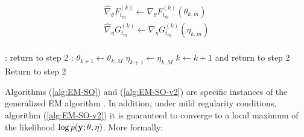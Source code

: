 \begin{algorithm}
\begin{algorithmic}[1]
\begin{gather}
            \widehat \nabla_\theta F_{t_m}^{(k)} \leftarrow \nabla_\theta F_{t_m}^{(k)}(\theta_{k,m}) \\
            \widehat \nabla_\eta G_{t_m}^{(k)} \leftarrow \nabla_\eta G_{t_m}^{(k)}(\eta_{k,m})
        \end{gather}
    \EndIf
\EndFor
%
\\
%
:
    \State return to step 2 
\Else:
    \State $\theta_{k+1} \leftarrow \theta_{k,M}$
    \State $\eta_{k+1} \leftarrow \eta_{k,M}$
    \State $k \leftarrow k+1$ and return to step 2
\EndIf
%
\State Return to step 2
\end{algorithmic}
\end{algorithm}


Algorithms (\ref{alg:EM-SO}) and (\ref{alg:EM-SO-v2}) are specific instances of the generalized EM algorithm \citep{Dempster:1977}. In addition, under mild regularity conditions, algorithm (\ref{alg:EM-SO-v2}) it is guaranteed to converge to a local maximum of the likelihood $\log p(\mathbf{y};\theta,\eta)$. More formally:
    
